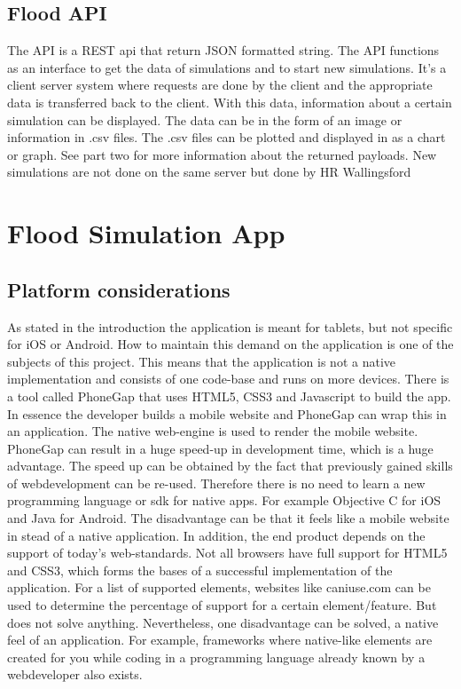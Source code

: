 \subsection{Flood API}
The API is a REST api that return JSON formatted string. The API functions as an interface to get the data of simulations and to start new simulations. It's a client server system where requests are done by the client and the appropriate data is transferred back to the client. With this data, information about a certain simulation can be displayed. The data can be in the form of an image or information in .csv files. The .csv files can be plotted and displayed in as a chart or graph. See part two for more information about the returned payloads.
New simulations are not done on the same server but done by HR Wallingsford 


\section{Flood Simulation App}
\subsection{Platform considerations}
As stated in the introduction the application is meant for tablets, but not specific for iOS or Android. How to maintain this demand on the application is one of the subjects of this project. This means that the application is not a native implementation and consists of one code-base and runs on more devices. There is a tool called PhoneGap \cite{PhoneGap} that uses HTML5, CSS3 and Javascript to build the app. In essence the developer builds a mobile website and PhoneGap can wrap this in an application. The native web-engine is used to render the mobile website. PhoneGap can result in a huge speed-up in development time, which is a huge advantage.  The speed up can be obtained by the fact that previously gained skills of webdevelopment can be re-used. Therefore there is no need to learn a new programming language or sdk for native apps. For example Objective C for iOS and Java for Android. The disadvantage can be that it feels like a mobile website in stead of a native application. In addition, the end product depends on the support of today's web-standards. Not all browsers have full support for HTML5 and CSS3, which forms the bases of a successful implementation of the application. For a list of supported elements, websites like caniuse.com \cite{CSS3} can be used to determine the percentage of support for a certain element/feature. But does not solve anything. Nevertheless, one disadvantage can be solved, a native feel of an application. For example, frameworks where native-like elements are created for you while coding in a programming language already known by a webdeveloper also exists.

